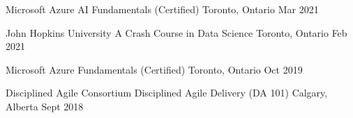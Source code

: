



\begin{cvhonors}

  \cvhonor
    {Microsoft} %
    {Azure AI Fundamentals (Certified)} %
    {Toronto, Ontario} %
    {Mar 2021} %

  \cvhonor
    {John Hopkins University} %
    {A Crash Course in Data Science} %
    {Toronto, Ontario} %
    {Feb 2021} %

  \cvhonor
    {Microsoft} %
    {Azure Fundamentals (Certified)} %
    {Toronto, Ontario} %
    {Oct 2019} %

  \cvhonor
    {Disciplined Agile Consortium} %
    {Disciplined Agile Delivery (DA 101)} %
    {Calgary, Alberta} %
    {Sept 2018} %

\end{cvhonors}
